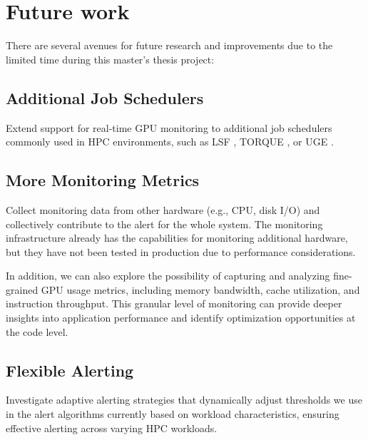 
\section{Future work}
There are several avenues for future research and improvements due to the limited time during this master's thesis project:

\subsection{Additional Job Schedulers}
Extend support for real-time GPU monitoring to additional job schedulers commonly used in HPC environments, such as LSF \cite{10.1145/3569951.3597564}, TORQUE \cite{10.1145/1188455.1188464}, or UGE \cite{10.1145/3332186.3338408}.

\subsection{More Monitoring Metrics}
Collect monitoring data from other hardware (e.g., CPU, disk I/O) and collectively contribute to the alert for the whole system. The monitoring infrastructure already has the capabilities for monitoring additional hardware, but they have not been tested in production due to performance considerations.

In addition, we can also explore the possibility of capturing and analyzing fine-grained GPU usage metrics, including memory bandwidth, cache utilization, and instruction throughput. This granular level of monitoring can provide deeper insights into application performance and identify optimization opportunities at the code level.

\subsection{Flexible Alerting}
Investigate adaptive alerting strategies that dynamically adjust thresholds we use in the alert algorithms currently based on workload characteristics, ensuring effective alerting across varying HPC workloads.

